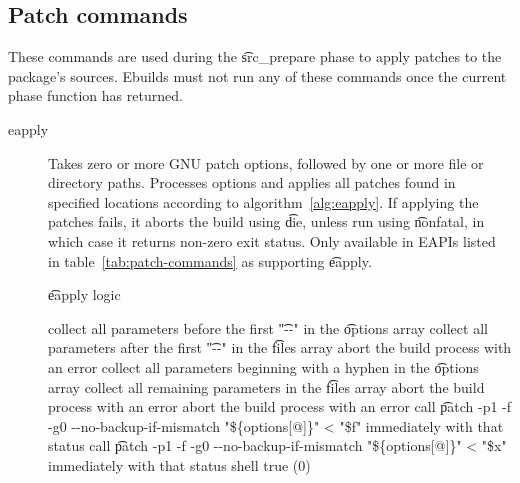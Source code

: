 \subsection{Patch commands}
These commands are used during the \t{src_prepare} phase to apply patches to the package's sources.
Ebuilds must not run any of these commands once the current phase function has returned.

\begin{description}
\item[eapply]  Takes zero or more GNU patch options, followed by one or more
    file or directory paths. Processes options and applies all patches found in specified locations
    according to algorithm~\ref{alg:eapply}. If applying the patches fails, it aborts the build
    using \t{die}, unless run using \t{nonfatal}, in which case it returns non-zero exit status.
    Only available in EAPIs listed in table~\ref{tab:patch-commands} as supporting \t{eapply}.

\begin{algorithm}
\caption{\t{eapply} logic} \label{alg:eapply}
\begin{algorithmic}[1]
    \STATE collect all parameters before the first \t{"-{}-"} in the \t{options} array
    \STATE collect all parameters after the first \t{"-{}-"} in the \t{files} array
    \STATE abort the build process with an error
\ELSE
    \STATE collect all parameters beginning with a hyphen in the \t{options} array
    \STATE collect all remaining parameters in the \t{files} array
\ENDIF
{}
    \STATE abort the build process with an error
\ENDIF
{}
            \STATE abort the build process with an error
        \ENDIF
            \STATE call \t{patch -p1 -f -g0 -{}-no-backup-if-mismatch "\$\{options[@]\}" < "\$f"}
                \RETURN immediately with that status
            \ENDIF
        \ENDFOR
    \ELSE
        \STATE call \t{patch -p1 -f -g0 -{}-no-backup-if-mismatch "\$\{options[@]\}" < "\$x"}
            \RETURN immediately with that status
        \ENDIF
    \ENDIF
\ENDFOR
\RETURN shell true (0)
\end{algorithmic}
\end{algorithm}


\end{description}
